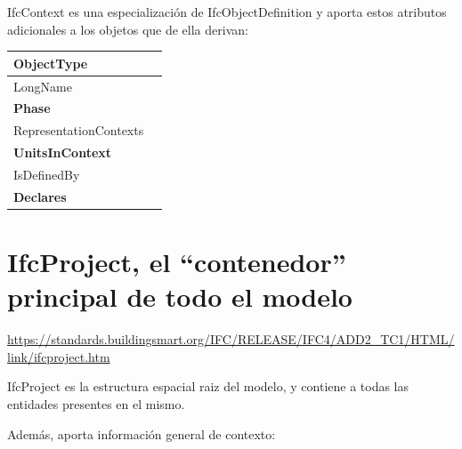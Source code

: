 \documentclass[spanish,12pt,a4paper,final,oneside]{book}
\begin{document}
IfcContext es una especialización de IfcObjectDefinition y aporta estos atributos adicionales a los objetos que de ella derivan:

\begin{longtable}{|p{3.5cm} p{10cm}|}
\hline

ObjectType & 
\\[0.1cm] \hline

LongName & 
\\[0.1cm] \hline

\textbf{Phase} & 
\\[0.1cm] \hline

RepresentationContexts & 
\\[0.1cm] \hline

\textbf{UnitsInContext} & 
\\[0.1cm] \hline

IsDefinedBy & 
\\[0.1cm] \hline

\textbf{Declares} & 
\\[0.1cm] \hline

\end{longtable}




\section{IfcProject, el ``contenedor'' principal de todo el modelo} \label{entidades_proyecto}
\url{https://standards.buildingsmart.org/IFC/RELEASE/IFC4/ADD2_TC1/HTML/link/ifcproject.htm}

IfcProject es la estructura espacial raiz del modelo, y contiene a todas las entidades presentes en el mismo.

Además, aporta información general de contexto:
\end{document}
